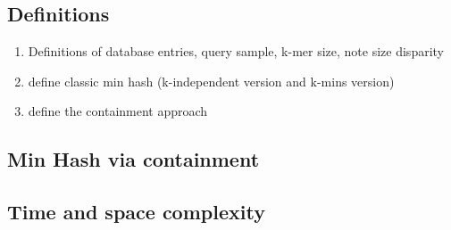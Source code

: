 \documentclass[11pt]{amsart}
\theoremstyle{remark}
\numberwithin{equation}{section}
\begin{document}
\subsection{Definitions}
\begin{enumerate}
\item Definitions of database entries, query sample, k-mer size, note size disparity
\item define classic min hash (k-independent version and k-mins version)
\item define the containment approach
\end{enumerate}
\subsection{Min Hash via containment}
\label{section:ChernoffBounds}
\subsection{Time and space complexity}
\end{document}
